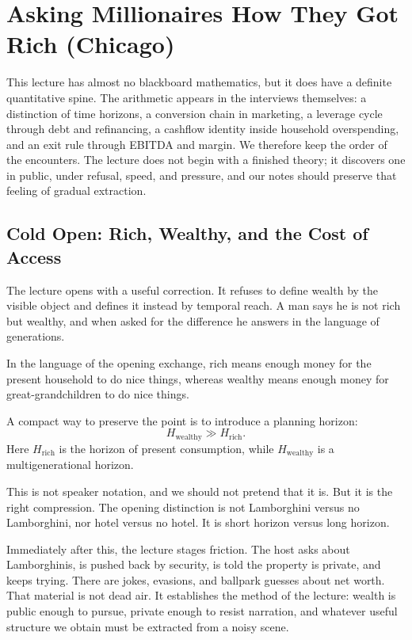 \chapter{Asking Millionaires How They Got Rich (Chicago)}

This lecture has almost no blackboard mathematics, but it does have a definite quantitative spine. The arithmetic appears in the interviews themselves: a distinction of time horizons, a conversion chain in marketing, a leverage cycle through debt and refinancing, a cashflow identity inside household overspending, and an exit rule through EBITDA and margin. We therefore keep the order of the encounters. The lecture does not begin with a finished theory; it discovers one in public, under refusal, speed, and pressure, and our notes should preserve that feeling of gradual extraction.

\section{Cold Open: Rich, Wealthy, and the Cost of Access}

The lecture opens with a useful correction. It refuses to define wealth by the visible object and defines it instead by temporal reach. A man says he is not rich but wealthy, and when asked for the difference he answers in the language of generations.

\begin{definition}
In the language of the opening exchange, rich means enough money for the present household to do nice things, whereas wealthy means enough money for great-grandchildren to do nice things.
\end{definition}

A compact way to preserve the point is to introduce a planning horizon:
\begin{equation}
H_{\text{wealthy}} \gg H_{\text{rich}}.
\end{equation}
Here \(H_{\text{rich}}\) is the horizon of present consumption, while \(H_{\text{wealthy}}\) is a multigenerational horizon.

This is not speaker notation, and we should not pretend that it is. But it is the right compression. The opening distinction is not Lamborghini versus no Lamborghini, nor hotel versus no hotel. It is short horizon versus long horizon.

Immediately after this, the lecture stages friction. The host asks about Lamborghinis, is pushed back by security, is told the property is private, and keeps trying. There are jokes, evasions, and ballpark guesses about net worth. That material is not dead air. It establishes the method of the lecture: wealth is public enough to pursue, private enough to resist narration, and whatever useful structure we obtain must be extracted from a noisy scene.

